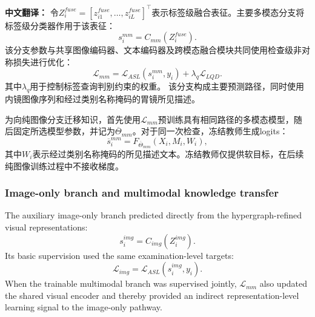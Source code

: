 \documentclass[Afour,sagev,times]{sagej}
\begin{document}
\textbf{中文翻译：} 令$Z_i^{fuse}=[z_{i1}^{fuse},\ldots,z_{iL}^{fuse}]^{\top}$表示标签级融合表征。主要多模态分支将标签级分类器作用于该表征：
\begin{equation}
s_i^{mm}=C_{mm}(Z_i^{fuse}).
\end{equation}
该分支参数与共享图像编码器、文本编码器及跨模态融合模块共同使用检查级非对称损失进行优化：
\begin{equation}
\mathcal{L}_{mm}=\mathcal{L}_{ASL}(s_i^{mm},y_i)+\lambda_q\mathcal{L}_{LQD}.
\end{equation}
其中$\lambda_q$用于控制标签查询判别约束的权重。
该分支构成主要预测路径，同时使用内镜图像序列和经过类别名称掩码的胃镜所见描述。

为向纯图像分支迁移知识，首先使用$\mathcal{L}_{mm}$预训练具有相同路径的多模态模型，随后固定所选模型参数，并记为$\overline{\Theta}_{mm}$。对于同一次检查，冻结教师生成logits：
\begin{equation}
\overline{s}_i^{mm}=F_{\overline{\Theta}_{mm}}(X_i,M_i,W_i),
\end{equation}
其中$W_i$表示经过类别名称掩码的所见描述文本。冻结教师仅提供软目标，在后续纯图像训练过程中不接收梯度。

\subsubsection{Image-only branch and multimodal knowledge transfer}

The auxiliary image-only branch predicted directly from the hypergraph-refined visual representations:
\begin{equation}
s_i^{img}=C_{img}(Z_i^{img}).
\end{equation}
Its basic supervision used the same examination-level targets:
\begin{equation}
\mathcal{L}_{img}=\mathcal{L}_{ASL}(s_i^{img},y_i).
\end{equation}
When the trainable multimodal branch was supervised jointly, $\mathcal{L}_{mm}$ also updated the shared visual encoder and thereby provided an indirect representation-level learning signal to the image-only pathway.
\end{document}

